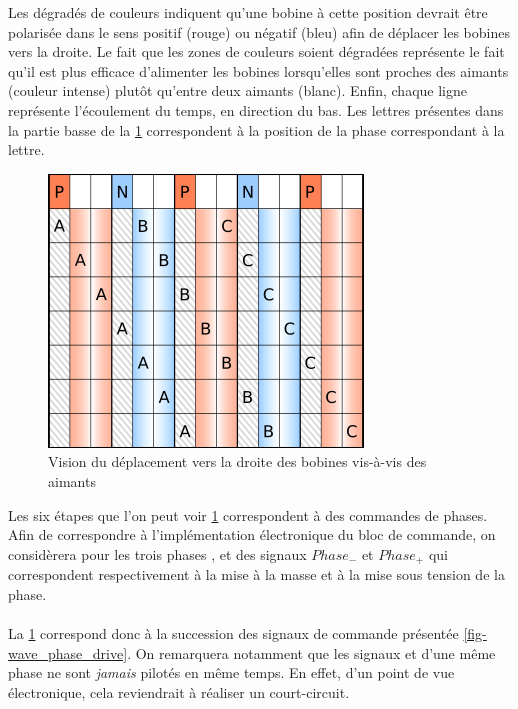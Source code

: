 Les dégradés de couleurs indiquent qu'une bobine à cette position devrait être polarisée dans le sens positif (rouge) ou négatif (bleu) afin de déplacer les bobines vers la droite.
Le fait que les zones de couleurs soient dégradées représente le fait qu'il est plus efficace d'alimenter les bobines lorsqu'elles sont proches des aimants (couleur intense) plutôt qu'entre deux aimants (blanc).
Enfin, chaque ligne représente l'écoulement du temps, en direction du bas.
Les lettres présentes dans la partie basse de la \cref{fig-bobines_vs_aimants} correspondent à la position de la phase correspondant à la lettre.
\begin{figure}[h]
    \centering
    \includegraphics{png/phases_aimants_switching.png}
    \caption{Vision du déplacement vers la droite des bobines vis-à-vis des aimants}
    \label{fig-bobines_vs_aimants}
\end{figure}

Les six étapes que l'on peut voir \cref{fig-bobines_vs_aimants} correspondent à des commandes de phases.
Afin de correspondre à l'implémentation électronique du bloc de commande, on considèrera pour les trois phases \pha, \phb et \phc des signaux $\mathit{Phase}_-$ et $\mathit{Phase}_+$
qui correspondent respectivement à la mise à la masse et à la mise sous tension de la phase.

\paragraph{}
La \cref{fig-bobines_vs_aimants} correspond donc à la succession des signaux de commande présentée \cref{fig-wave_phase_drive}. 
On remarquera notamment que les signaux  et  d'une même phase ne sont \emph{jamais} pilotés en même temps.
En effet, d'un point de vue électronique, cela reviendrait à réaliser un court-circuit. 

